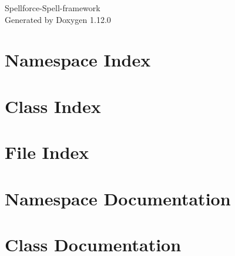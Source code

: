 \documentclass[twoside]{book}
\newcommand{\+}{\discretionary{\mbox{\scriptsize$\hookleftarrow$}}{}{}}
\newcommand{\clearemptydoublepage}{%
    \newpage{\pagestyle{empty}\cleardoublepage}%
  }
\begin{document}
  \raggedbottom
    \hypersetup{pageanchor=false,
                bookmarksnumbered=true,
                pdfencoding=unicode
               }
  \begin{titlepage}
  \vspace*{7cm}
  \begin{center}%
  {\Large Spellforce-\/\+Spell-\/framework}\\
  \vspace*{1cm}
  {\large Generated by Doxygen 1.12.0}\\
  \end{center}
  \end{titlepage}
  \clearemptydoublepage
  \tableofcontents
  \clearemptydoublepage
  \hypersetup{pageanchor=true}
\chapter{Namespace Index}

\chapter{Class Index}

\chapter{File Index}

\chapter{Namespace Documentation}

\chapter{Class Documentation}









\end{document}

